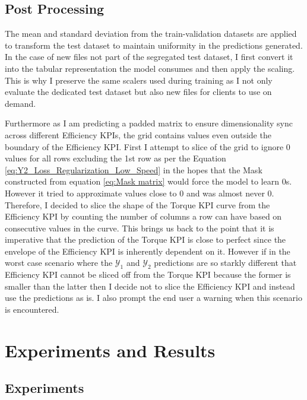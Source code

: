 \documentclass{report} %
\begin{document}
\section{Post Processing}\label{sec:Post Processing}
The mean and standard deviation from the train-validation datasets are applied to transform the test dataset to maintain uniformity in the predictions generated.
In the case of new files not part of the segregated test dataset, I first convert it into the tabular representation the model consumes and then apply the scaling.
This is why I preserve the same scalers used during training as I not only evaluate the dedicated test dataset but also new files for clients to use on demand. 

Furthermore as I am predicting a padded matrix to ensure dimensionality sync across different Efficiency \ac{KPI}s, the grid contains values even outside the boundary 
of the Efficiency \ac{KPI}.
First I attempt to slice of the grid to ignore 0 values for all rows excluding the 1st row as per the Equation \ref{eq:Y2_Loss_Regularization_Low_Speed} in the 
hopes that the Mask constructed from equation \ref{eq:Mask matrix} would force the model to learn 0s. However it tried to approximate values close to 0 and was almost never 0.\\
Therefore, I decided to slice the shape of the Torque \ac{KPI} curve from the Efficiency \ac{KPI} by counting the number of columns a row can have based on consecutive 
values in the curve.
This brings us back to the point that it is imperative that the prediction of the Torque \ac{KPI} is close to perfect since the envelope of the Efficiency \ac{KPI} is 
inherently dependent on it.
However if in the worst case scenario where the $\mathcal{Y}_1$ and $\mathcal{Y}_2$ predictions are so starkly different that Efficiency \ac{KPI} cannot be sliced off from 
the Torque \ac{KPI} because the former is smaller than the latter then I decide not to slice the Efficiency \ac{KPI} and instead use the predictions as is. I also 
prompt the end user a warning when this scenario is encountered.

\chapter{Experiments and Results}

\section{Experiments}\label{sec:Experiments with MLP}
\end{document}
